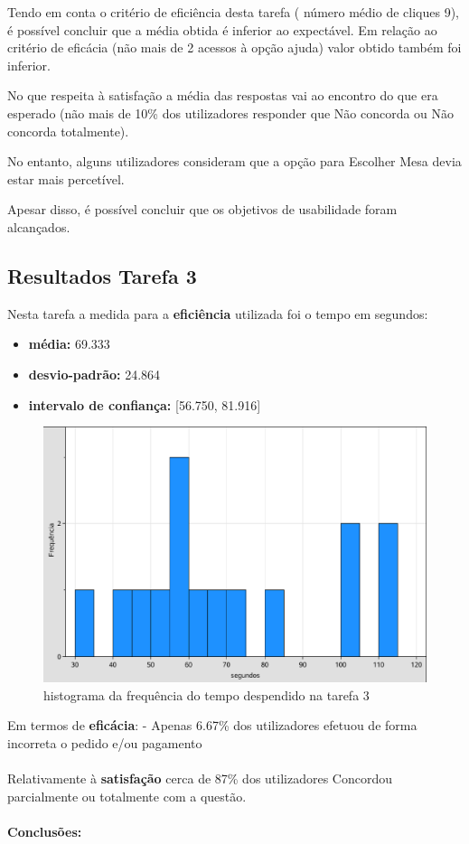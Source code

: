 \documentclass{article}
\begin{document}
Tendo em conta o critério de eficiência desta tarefa ( número médio de cliques 9), é possível concluir que a média obtida é inferior ao expectável. Em relação ao critério de eficácia (não mais de 2 acessos à opção ajuda) valor obtido também foi inferior.

No que respeita à satisfação a média das respostas vai ao encontro do que era esperado (não mais de 10\% dos utilizadores responder que Não concorda ou Não concorda totalmente).

No entanto, alguns utilizadores consideram que a opção para Escolher Mesa devia estar mais percetível.

Apesar disso, é possível concluir que os objetivos de usabilidade foram alcançados.

\subsection*{Resultados Tarefa 3}
Nesta tarefa a medida para a \textbf{eficiência} utilizada foi o tempo em segundos:
\begin{itemize}
\item\textbf{média:} 69.333 
\item\textbf{desvio-padrão:} 24.864
\item\textbf{intervalo de confiança:} [56.750, 81.916]
\end{itemize}
\begin{figure}[h]
\centering
\includegraphics[scale=0.35]{grafico3}
\caption{histograma da frequência do tempo despendido na tarefa 3}
\end{figure} Em termos de \textbf{eficácia}:
 - Apenas 6.67\% dos utilizadores efetuou de forma incorreta o pedido e/ou pagamento \\\\
Relativamente à \textbf{satisfação} cerca de 87\% dos utilizadores Concordou parcialmente ou totalmente com a questão.\\\\
\textbf{Conclusões:}
\end{document}
